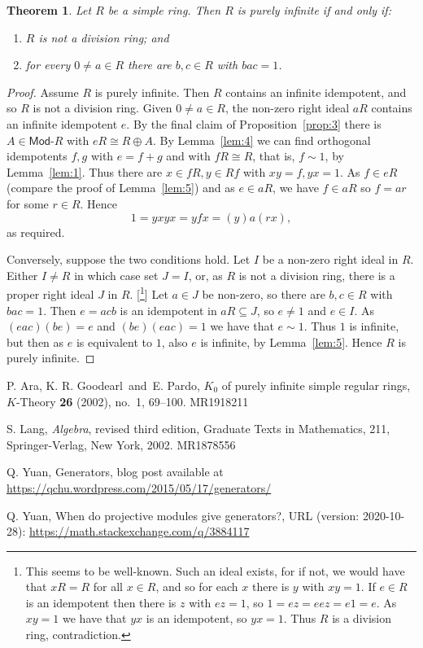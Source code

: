 \documentclass[a4paper,12pt]{article}
\theoremstyle{plain}
\newtheorem{theorem}[proposition]{Theorem}
\theoremstyle{definition}
\renewcommand{\mod}{\textsf{Mod-}}
\begin{document}
\begin{theorem}\label{thm:1}
Let $R$ be a simple ring.  Then $R$ is purely infinite if and only if:
\begin{enumerate}
\item $R$ is not a division ring; and
\item for every $0\not=a\in R$ there are $b,c\in R$ with $bac=1$.
\end{enumerate}
\end{theorem}
\begin{proof}
Assume $R$ is purely infinite.  Then $R$ contains an infinite idempotent, and so $R$ is not a division ring.
Given $0\not=a\in R$, the non-zero right ideal $aR$ contains an infinite idempotent $e$.  By the final claim of
Proposition~\ref{prop:3} there is $A\in\mod R$ with $eR \cong R \oplus A$.  By Lemma~\ref{lem:4} we can find
orthogonal idempotents $f,g$ with $e=f+g$ and with $fR \cong R$, that is, $f\sim 1$, by Lemma~\ref{lem:1}.
Thus there are $x\in fR, y\in Rf$ with $xy=f, yx=1$.  As $f\in eR$ (compare the proof of Lemma~\ref{lem:5})
and as $e\in aR$, we have $f\in aR$ so $f=ar$ for some $r\in R$.  Hence 
\[ 1 = yxyx = yfx = (y)a(rx), \]
as required.

Conversely, suppose the two conditions hold.  Let $I$ be a non-zero right ideal in $R$.
Either $I\not=R$ in which case set $J=I$, or, as $R$ is not a division ring, there is a proper
right ideal $J$ in $R$.
[\footnote{This seems to be well-known.  Such an ideal exists, for if not, we would have that
$xR=R$ for all $x\in R$, and so for each $x$ there is $y$ with $xy=1$.  If $e\in R$ is an idempotent
then there is $z$ with $ez=1$, so $1 = ez = eez = e1 = e$.  As $xy=1$ we have that $yx$ is an idempotent,
so $yx=1$.  Thus $R$ is a division ring, contradiction.}]
Let $a\in J$ be non-zero, so there are $b,c\in R$ with $bac=1$.  Then $e=acb$ is an idempotent in $aR\subseteq J$,
so $e\not=1$ and $e\in I$.
As $(eac)(be) = e$ and $(be)(eac) = 1$ we have that $e\sim 1$.  Thus $1$ is infinite, but then
as $e$ is equivalent to $1$, also $e$ is infinite, by Lemma~\ref{lem:5}.  Hence $R$ is purely infinite.
\end{proof}


\begin{thebibliography}{99}

 P. Ara, K. R. Goodearl\ and\ E. Pardo, $K_0$ of purely infinite simple regular rings, $K$-Theory {\bf 26} (2002), no.~1, 69--100. MR1918211

 S. Lang, {\it Algebra}, revised third edition, Graduate Texts in Mathematics, 211, Springer-Verlag, New York, 2002. MR1878556

 Q. Yuan, Generators, blog post available at \url{https://qchu.wordpress.com/2015/05/17/generators/}

 Q. Yuan, When do projective modules give generators?, URL (version: 2020-10-28): \url{https://math.stackexchange.com/q/3884117}

\end{thebibliography}
\end{document}
